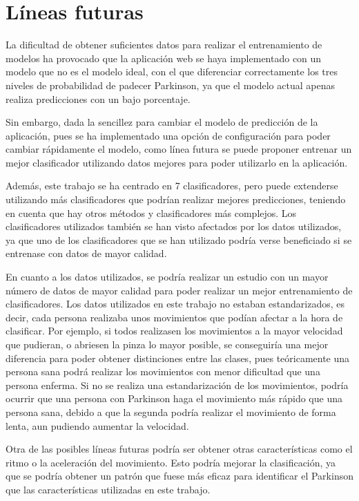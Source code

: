  \section{Líneas futuras}
 La dificultad de obtener suficientes datos para realizar el entrenamiento de modelos ha provocado que la aplicación web se haya implementado con un modelo que no es el modelo ideal, con el que diferenciar correctamente los tres niveles de probabilidad de padecer Parkinson, ya que el modelo actual apenas realiza predicciones con un bajo porcentaje.
 
 Sin embargo, dada la sencillez para cambiar el modelo de predicción de la aplicación, pues se ha implementado una opción de configuración para poder cambiar rápidamente el modelo, como línea futura se puede proponer entrenar un mejor clasificador utilizando datos mejores para poder utilizarlo en la aplicación.
 
 Además, este trabajo se ha centrado en 7 clasificadores, pero puede extenderse utilizando más clasificadores que podrían realizar mejores predicciones, teniendo en cuenta que hay otros métodos y clasificadores más complejos. Los clasificadores utilizados también se han visto afectados por los datos utilizados, ya que uno de los clasificadores que se han utilizado podría verse beneficiado si se entrenase con datos de mayor calidad. 
 
 En cuanto a los datos utilizados, se podría realizar un estudio con un mayor número de datos de mayor calidad para poder realizar un mejor entrenamiento de clasificadores. Los datos utilizados en este trabajo no estaban estandarizados, es decir, cada persona realizaba unos movimientos que podían afectar a la hora de clasificar. Por ejemplo, si todos realizasen los movimientos a la mayor velocidad que pudieran, o abriesen la pinza lo mayor posible, se conseguiría una mejor diferencia para poder obtener distinciones entre las clases, pues teóricamente una persona sana podrá realizar los movimientos con menor dificultad que una persona enferma. Si no se realiza una estandarización de los movimientos, podría ocurrir que una persona con Parkinson haga el movimiento más rápido que una persona sana, debido a que la segunda podría realizar el movimiento de forma lenta, aun pudiendo aumentar la velocidad.
 
 Otra de las posibles líneas futuras podría ser obtener otras características como el ritmo o la aceleración del movimiento. Esto podría mejorar la clasificación, ya que se podría obtener un patrón que fuese más eficaz para identificar el Parkinson que las características utilizadas en este trabajo.
